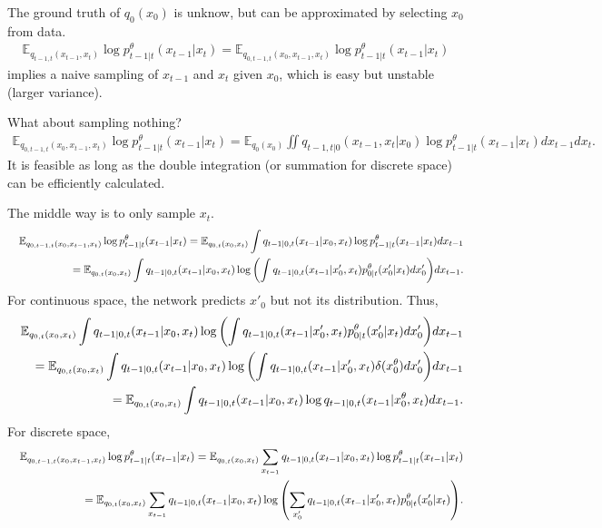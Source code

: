 \documentclass[10pt]{article}
\begin{document}
The ground truth of $q_0(x_0)$ is unknow, but can be approximated by selecting $x_0$ from data.
\begin{eqnarray*}
  \mathbb{E}_{q_{t-1,t}(x_{t-1},x_t)}\log p_{t-1|t}^\theta(x_{t-1}|x_t) = \mathbb{E}_{q_{0,t-1,t}(x_0,x_{t-1},x_t)}\log p_{t-1|t}^\theta(x_{t-1}|x_t)
\end{eqnarray*}
implies a naive sampling of $x_{t-1}$ and $x_t$ given $x_0$, which is easy but unstable (larger variance).

What about sampling nothing?
\begin{eqnarray*}
  \mathbb{E}_{q_{0,t-1,t}(x_0,x_{t-1},x_t)}\log p_{t-1|t}^\theta(x_{t-1}|x_t) = \mathbb{E}_{q_0(x_0)}\iint q_{t-1,t|0}(x_{t-1},x_t|x_0)\log p_{t-1|t}^\theta(x_{t-1}|x_t) dx_{t-1}dx_t.
\end{eqnarray*}
It is feasible as long as the double integration (or summation for discrete space) can be efficiently calculated.

The middle way is to only sample $x_t$.
\begin{eqnarray*}
  &&\mathbb{E}_{q_{0,t-1,t}(x_0,x_{t-1},x_t)}\log p_{t-1|t}^\theta(x_{t-1}|x_t) = \mathbb{E}_{q_{0,t}(x_0,x_t)}\int q_{t-1|0,t}(x_{t-1}|x_0,x_t)\log p_{t-1|t}^\theta(x_{t-1}|x_t) dx_{t-1}\\
  &&= \mathbb{E}_{q_{0,t}(x_0,x_t)}\int q_{t-1|0,t}(x_{t-1}|x_0,x_t)\log \qty(\int q_{t-1|0,t}(x_{t-1}|x'_0,x_t) p_{0|t}^\theta(x'_0|x_t) dx'_0) dx_{t-1}.
\end{eqnarray*}
For continuous space, the network predicts $x'_0$ but not its distribution. Thus,
\begin{eqnarray*}
  &&\mathbb{E}_{q_{0,t}(x_0,x_t)}\int q_{t-1|0,t}(x_{t-1}|x_0,x_t)\log \qty(\int q_{t-1|0,t}(x_{t-1}|x'_0,x_t) p_{0|t}^\theta(x'_0|x_t) dx'_0) dx_{t-1}\\
  &&=\mathbb{E}_{q_{0,t}(x_0,x_t)}\int q_{t-1|0,t}(x_{t-1}|x_0,x_t)\log \qty(\int q_{t-1|0,t}(x_{t-1}|x'_0,x_t) \delta(x_0^\theta) dx'_0) dx_{t-1}\\
  &&=\mathbb{E}_{q_{0,t}(x_0,x_t)}\int q_{t-1|0,t}(x_{t-1}|x_0,x_t)\log q_{t-1|0,t}(x_{t-1}|x^\theta_0,x_t) dx_{t-1}.
\end{eqnarray*}
For discrete space,
\begin{eqnarray}\label{EqDisSpaTarget}
  &&\mathbb{E}_{q_{0,t-1,t}(x_0,x_{t-1},x_t)}\log p_{t-1|t}^\theta(x_{t-1}|x_t) = \mathbb{E}_{q_{0,t}(x_0,x_t)}\sum_{x_{t-1}} q_{t-1|0,t}(x_{t-1}|x_0,x_t)\log p_{t-1|t}^\theta(x_{t-1}|x_t)\nonumber\\
  &&= \mathbb{E}_{q_{0,t}(x_0,x_t)}\sum_{x_{t-1}} q_{t-1|0,t}(x_{t-1}|x_0,x_t)\log \qty(\sum_{x'_0} q_{t-1|0,t}(x_{t-1}|x'_0,x_t) p_{0|t}^\theta(x'_0|x_t)).
\end{eqnarray}
\end{document}
